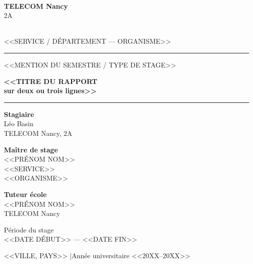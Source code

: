 \begin{titlepage}
  \centering

  \begin{minipage}{0.45\textwidth}
    \centering
    \\
    {\Large\textbf{TELECOM Nancy}}\\
    {\small 2A}
  \end{minipage}
  \hfill
  \begin{minipage}{0.45\textwidth}
    \centering
    \\[0.3em]
    {\small <<SERVICE / DÉPARTEMENT — ORGANISME>>}
  \end{minipage}

  \vspace{1.5cm}
  \rule{\textwidth}{0.5pt}
  \vspace{0.5cm}

  {\small <<MENTION DU SEMESTRE / TYPE DE STAGE>>}

  \vspace{1cm}

  {\LARGE\bfseries <<TITRE DU RAPPORT\\[0.3em]
  sur deux ou trois lignes>>}

  \vspace{0.5cm}
  \rule{\textwidth}{0.5pt}

  \vspace{2cm}

  \begin{minipage}{0.48\textwidth}
    \textbf{Stagiaire}\\
    Léo Basin\\
    TELECOM Nancy, 2A
  \end{minipage}
  \hfill
  \begin{minipage}{0.48\textwidth}
    \textbf{Maître de stage}\\
    <<PRÉNOM NOM>>\\
    <<SERVICE>>\\
    <<ORGANISME>>
  \end{minipage}

  \vspace{1.5cm}

  \begin{minipage}{0.48\textwidth}
    \textbf{Tuteur école}\\
    <<PRÉNOM NOM>>\\
    TELECOM Nancy
  \end{minipage}

  \vspace{2cm}

  {\large Période du stage}\\[0.3em]
  {\large <<DATE DÉBUT>> — <<DATE FIN>>}

  \vfill

  {\small <<VILLE, PAYS>> \quad|\quad Année universitaire <<20XX--20XX>>}
\end{titlepage}
